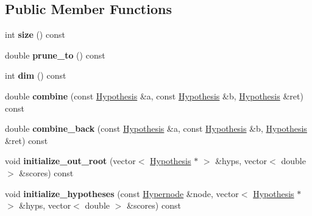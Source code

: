 \subsection*{Public Member Functions}
\begin{DoxyCompactItemize}
\item 
\hypertarget{classScarab_1_1HG_1_1TrivialController_a219f546e952ff25c74914ef86f4c1f4f}{
int {\bfseries size} () const }
\label{classScarab_1_1HG_1_1TrivialController_a219f546e952ff25c74914ef86f4c1f4f}

\item 
\hypertarget{classScarab_1_1HG_1_1TrivialController_abb65cff01d325ca4deca44a95ae08cc5}{
double {\bfseries prune\_\-to} () const }
\label{classScarab_1_1HG_1_1TrivialController_abb65cff01d325ca4deca44a95ae08cc5}

\item 
\hypertarget{classScarab_1_1HG_1_1TrivialController_a8592deee53061c8a720765992567f660}{
int {\bfseries dim} () const }
\label{classScarab_1_1HG_1_1TrivialController_a8592deee53061c8a720765992567f660}

\item 
\hypertarget{classScarab_1_1HG_1_1TrivialController_a2442adbb71b2da7238b6a250612af383}{
double {\bfseries combine} (const \hyperlink{structScarab_1_1HG_1_1Hypothesis}{Hypothesis} \&a, const \hyperlink{structScarab_1_1HG_1_1Hypothesis}{Hypothesis} \&b, \hyperlink{structScarab_1_1HG_1_1Hypothesis}{Hypothesis} \&ret) const }
\label{classScarab_1_1HG_1_1TrivialController_a2442adbb71b2da7238b6a250612af383}

\item 
\hypertarget{classScarab_1_1HG_1_1TrivialController_a6fd129fe20b8fe3b3be7b4bda44a3afb}{
double {\bfseries combine\_\-back} (const \hyperlink{structScarab_1_1HG_1_1Hypothesis}{Hypothesis} \&a, const \hyperlink{structScarab_1_1HG_1_1Hypothesis}{Hypothesis} \&b, \hyperlink{structScarab_1_1HG_1_1Hypothesis}{Hypothesis} \&ret) const }
\label{classScarab_1_1HG_1_1TrivialController_a6fd129fe20b8fe3b3be7b4bda44a3afb}

\item 
\hypertarget{classScarab_1_1HG_1_1TrivialController_a9260e2100ffa5d8546ec84720f45cf81}{
void {\bfseries initialize\_\-out\_\-root} (vector$<$ \hyperlink{structScarab_1_1HG_1_1Hypothesis}{Hypothesis} $\ast$ $>$ \&hyps, vector$<$ double $>$ \&scores) const }
\label{classScarab_1_1HG_1_1TrivialController_a9260e2100ffa5d8546ec84720f45cf81}

\item 
\hypertarget{classScarab_1_1HG_1_1TrivialController_ae0fc7eac47cc9cd0a7776713775c5b6c}{
void {\bfseries initialize\_\-hypotheses} (const \hyperlink{classScarab_1_1HG_1_1Hypernode}{Hypernode} \&node, vector$<$ \hyperlink{structScarab_1_1HG_1_1Hypothesis}{Hypothesis} $\ast$ $>$ \&hyps, vector$<$ double $>$ \&scores) const }
\label{classScarab_1_1HG_1_1TrivialController_ae0fc7eac47cc9cd0a7776713775c5b6c}


\end{DoxyCompactItemize}
